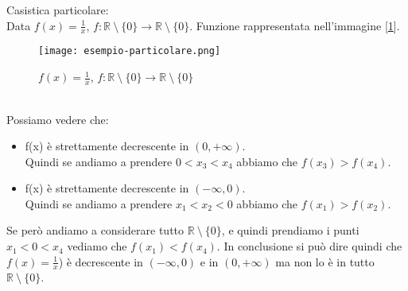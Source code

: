 \begin{example}
    Casistica particolare:\\
    Data $f(x)=\frac{1}{x}$, \hspace{.3cm} $f: \mathbb{R} \: \setminus \: \{0\} \longrightarrow \mathbb{R} \: \setminus \: \{0\}$. Funzione rappresentata nell'immagine [\ref{fig:esempio-particolare}].
    \begin{figure}[h!]
        \centering
        \texttt{[image: esempio-particolare.png]}
        \caption{$f(x)=\frac{1}{x}$, \hspace{.3cm} $f: \mathbb{R} \: \setminus \: \{0\} \longrightarrow \mathbb{R} \: \setminus \: \{0\}$}
        \label{fig:esempio-particolare}
    \end{figure}
    \\Possiamo vedere che:
    \begin{itemize}
        \item f(x) è strettamente decrescente in $(0, +\infty)$.\\
        Quindi se andiamo a prendere $0 < x_3 < x_4$ abbiamo che $f(x_3) > f(x_4)$.
        \item f(x) è strettamente decrescente in $(-\infty, 0)$.\\
        Quindi se andiamo a prendere $x_1 < x_2 < 0$ abbiamo che $f(x_1) > f(x_2)$.
    \end{itemize}
    Se però andiamo a considerare tutto $\mathbb{R} \: \setminus \: \{0\}$, e quindi prendiamo i punti $x_1 < 0 < x_4$ vediamo che $f(x_1) < f(x_4)$.
    In conclusione si può dire quindi che $f(x)=\frac{1}{x}$) è decrescente in $(-\infty, 0)$ e in $(0, +\infty)$ ma non lo è in tutto $\mathbb{R} \: \setminus \: \{0\}$.
\end{example}

